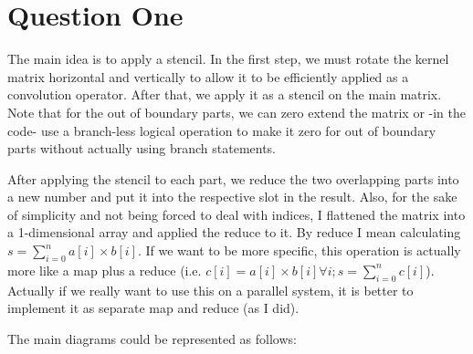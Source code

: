 \documentclass[12pt]{article}
\begin{document}
\section{Question One}

The main idea is to apply a stencil. In the first step, we must rotate the kernel matrix horizontal and vertically to allow it to be efficiently applied as a convolution operator. After that, we apply it as a stencil on the main matrix. Note that for the out of boundary parts, we can zero extend the matrix or -in the code- use a branch-less logical operation to make it zero for out of boundary parts without actually using branch statements.

After applying the stencil to each part, we reduce the two overlapping parts into a new number and put it into the respective slot in the result. Also, for the sake of simplicity and not being forced to deal with indices, I flattened the matrix into a 1-dimensional array and applied the reduce to it. By reduce I mean calculating $s = \sum_{i=0}^{n} a[i]\times b[i]$.
If we want to be more specific, this operation is actually more like a map plus a reduce (i.e. $c[i] = a[i] \times b[i] \forall i; s = \sum_{i=0}^{n} c[i]$). Actually if we really want to use this on a parallel system, it is better to implement it as separate map and reduce (as I did).


The main diagrams could be represented as follows:
\end{document}
